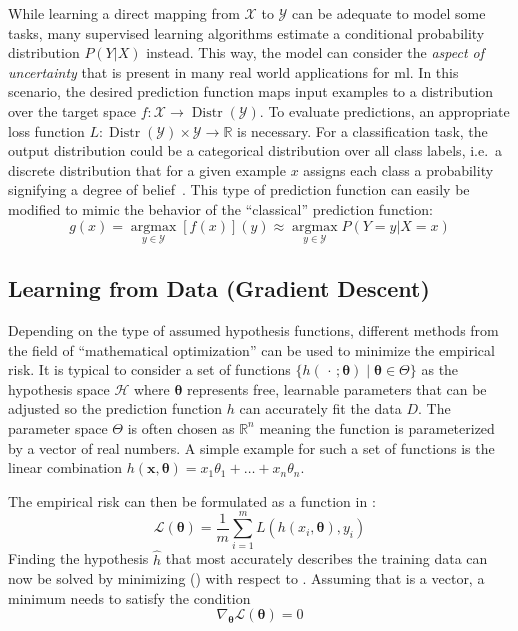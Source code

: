 While learning a direct mapping from $\mathcal{X}$ to $\mathcal{Y}$ can be adequate to model some tasks, many supervised learning algorithms estimate a conditional probability distribution $P(Y | X)$ instead.
This way, the model can consider the \textit{aspect of uncertainty} that is present in many real world applications for \gls{ml}.
In this scenario, the desired prediction function maps input examples to a distribution over the target space $f: \mathcal{X} \rightarrow \operatorname{Distr}(\mathcal{Y})$.
To evaluate predictions, an appropriate loss function $L: \operatorname{Distr}(\mathcal{Y}) \times \mathcal{Y} \rightarrow \mathbb{R}$ is necessary.
For a classification task, the output distribution could be a categorical distribution over all class labels, i.e.\ a discrete distribution that for a given example $x$ assigns each class a probability signifying a degree of belief~\autocite{Goodfellow-et-al-2016}.
This type of prediction function can easily be modified to mimic the behavior of the \enquote{classical} prediction function:
\[
    g(x) =\underset{y \in \mathcal{Y}}{\operatorname{argmax}} [f(x)](y) \approx \underset{y \in \mathcal{Y}}{\operatorname{argmax}} P(Y=y|X=x)
\]

\subsection{Learning from Data (Gradient Descent)}\label{subsec:learning-from-data}
Depending on the type of assumed hypothesis functions, different methods from the field of \enquote{mathematical optimization} can be used to minimize the empirical risk.
It is typical to consider a set of functions $\{h(\,\cdot\, ; \boldsymbol{\theta}) \mid \boldsymbol{\theta} \in \Theta \}$ as the hypothesis space $\mathcal{H}$ where $\boldsymbol{\theta}$ represents free, learnable parameters that can be adjusted so the prediction function $h$ can accurately fit the data $D$.
The parameter space $\Theta$ is often chosen as $\mathbb{R}^n$ meaning the function is parameterized by a vector of real numbers.
A simple example for such a set of functions is the linear combination $h(\boldsymbol{x}, \boldsymbol{\theta}) = x_1\theta_1 + \dots + x_n\theta_n$.

The empirical risk can then be formulated as a function in \boldsymbol{\theta}:
\[
    \mathcal{L}(\boldsymbol{\theta}) = \frac{1}{m}\sum_{i=1}^{m} L(h(x_i, \boldsymbol{\theta}), y_i)
\]
Finding the hypothesis $\hat{h}$ that most accurately describes the training data can now be solved by minimizing (\boldsymbol{\theta}) with respect to \boldsymbol{\theta}.
Assuming that \boldsymbol{\theta} is a vector, a minimum needs to satisfy the condition
\[
    \nabla_{\boldsymbol{\theta}}\mathcal{L}(\boldsymbol{\theta}) = 0
\]


